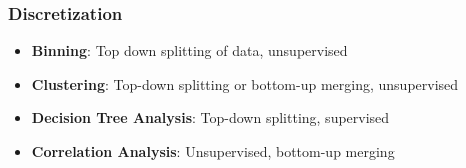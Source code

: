 \documentclass{article}
\theoremstyle{plain}
\theoremstyle{definition}
\begin{document}
\subsubsection{Discretization}
\begin{itemize}
    \item \textbf{Binning}: Top down splitting of data, unsupervised
    
    \item \textbf{Clustering}: Top-down splitting or bottom-up merging, unsupervised
    
    \item \textbf{Decision Tree Analysis}: Top-down splitting, supervised
    
    \item \textbf{Correlation Analysis}: Unsupervised, bottom-up merging
\end{itemize}
\end{document}
